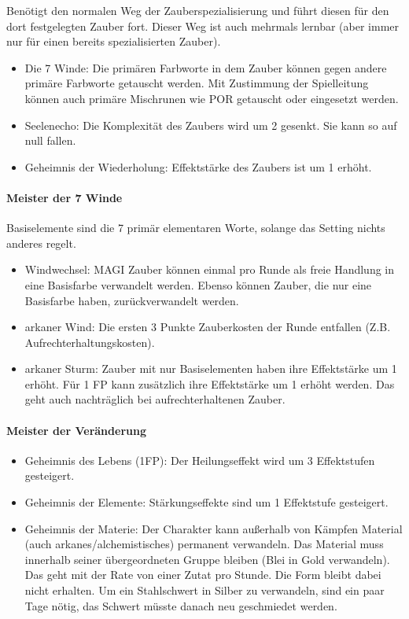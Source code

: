 \documentclass{article}
\begin{document}
Benötigt den normalen Weg der Zauberspezialisierung und führt diesen für den dort festgelegten Zauber fort. Dieser Weg
ist auch mehrmals lernbar (aber immer nur für einen bereits spezialisierten Zauber).

\begin{itemize}
\item Die 7 Winde: Die primären Farbworte in dem Zauber können gegen andere primäre Farbworte getauscht werden. Mit Zustimmung der Spielleitung können auch primäre Mischrunen wie POR getauscht oder eingesetzt werden.
\item Seelenecho: Die Komplexität des Zaubers wird um 2 gesenkt. Sie kann so auf null fallen.
\item Geheimnis der Wiederholung: Effektstärke des Zaubers ist um 1 erhöht.
\end{itemize}

\paragraph{Meister der 7 Winde}

Basiselemente sind die 7 primär elementaren Worte, solange das Setting nichts anderes regelt.

\begin{itemize}
\item Windwechsel: MAGI Zauber können einmal pro Runde als freie Handlung in eine Basisfarbe verwandelt werden. Ebenso können Zauber, die nur eine Basisfarbe haben, zurückverwandelt werden.
\item arkaner Wind: Die ersten 3 Punkte Zauberkosten der Runde entfallen (Z.B. Aufrechterhaltungskosten).
\item arkaner Sturm: Zauber mit nur Basiselementen haben ihre Effektstärke um 1 erhöht. Für 1 FP kann zusätzlich ihre Effektstärke um 1 erhöht werden. Das geht auch nachträglich bei aufrechterhaltenen Zauber.
\end{itemize}

\paragraph{Meister der Veränderung}

\begin{itemize}
\item Geheimnis des Lebens (1FP): Der Heilungseffekt wird um 3 Effektstufen gesteigert.
\item Geheimnis der Elemente: Stärkungseffekte sind um 1 Effektstufe gesteigert.
\item Geheimnis der Materie: Der Charakter kann außerhalb von Kämpfen Material (auch arkanes/alchemistisches) permanent verwandeln. Das Material muss innerhalb seiner übergeordneten Gruppe bleiben (Blei in Gold verwandeln). Das geht mit der Rate von einer Zutat pro Stunde. Die Form bleibt dabei nicht erhalten. Um ein Stahlschwert in Silber zu verwandeln, sind ein paar Tage nötig, das Schwert müsste danach neu geschmiedet werden.
\end{itemize}
\end{document}

